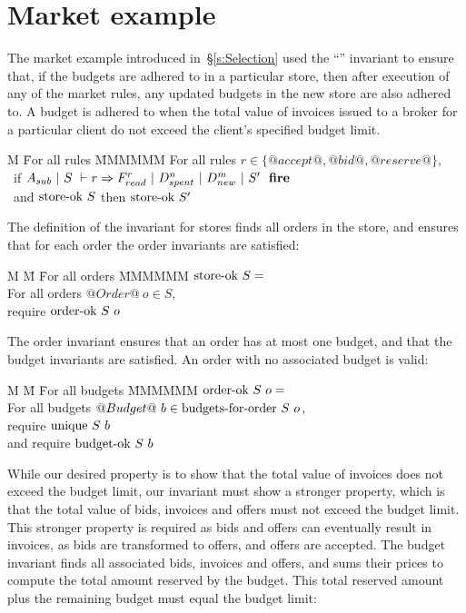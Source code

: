 \appendix
\section{Market example}

The market example introduced in~\S\ref{s:Selection} used the ``'' invariant to ensure that, if the budgets are adhered to in a particular store, then after execution of any of the market rules, any updated budgets in the new store are also adhered to.
A budget is adhered to when the total value of invoices issued to a broker for a particular client do not exceed the client's specified budget limit.

\begin{tabbing}
M \= For all rules \= MMMMMM \kill
\> For all rules \> $r \in \{@accept@, @bid@, @reserve@\}$, \\
\> ~if   \> $A_{sub}~|~S~\vdash r \Rightarrow F_{read}^r~|~D_{spent}^n~|~D_{new}^m~|~S'~~\textbf{fire}$ \\
\> ~and \> $\textrm{store-ok}~{S}$ \hspace{1ex} then \hspace{1ex} $\textrm{store-ok}~{S'}$
\end{tabbing}

The definition of the invariant for stores finds all orders in the store, and ensures that for each order the order invariants are satisfied:

\begin{tabbing}
M \= M \= For all orders \= MMMMMM \kill
\> $\textrm{store-ok}~{S} = $ \\
\> \> For all orders \> $@Order@~o \in S$, \\
\> \> require \> $\textrm{order-ok}~{S}~o$
\end{tabbing}

The order invariant ensures that an order has at most one budget, and that the budget invariants are satisfied. An order with no associated budget is valid:

\begin{tabbing}
M \= M \= For all budgets \= MMMMMM \kill
\> $\textrm{order-ok}~{S}~o = $ \\
\> \> For all budgets \> $@Budget@~b \in \textrm{budgets-for-order}~S~o$, \\
\> \> require \> $\textrm{unique}~S~b$ \\
\> \> and require \> $\textrm{budget-ok}~{S}~b$
\end{tabbing}

While our desired property is to show that the total value of invoices does not exceed the budget limit, our invariant must show a stronger property, which is that the total value of bids, invoices and offers must not exceed the budget limit.
This stronger property is required as bids and offers can eventually result in invoices, as bids are transformed to offers, and offers are accepted. 
The budget invariant finds all associated bids, invoices and offers, and sums their prices to compute the total amount reserved by the budget.
This total reserved amount plus the remaining budget must equal the budget limit:

